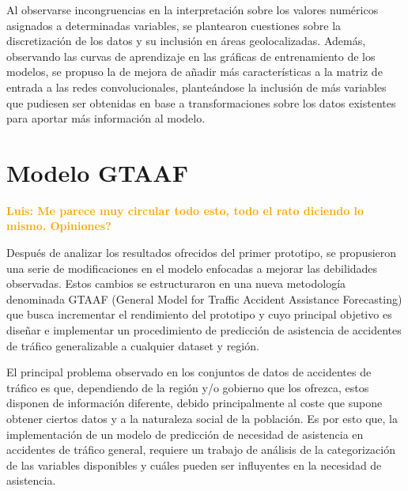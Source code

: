 
Al observarse incongruencias en la interpretación sobre los valores numéricos asignados a determinadas variables, se plantearon cuestiones sobre la discretización de los datos y su inclusión en áreas geolocalizadas. Además, observando las curvas de aprendizaje en las gráficas de entrenamiento de los modelos, se propuso la de mejora de añadir más características a la matriz de entrada a las redes convolucionales, planteándose la inclusión de más variables que pudiesen ser obtenidas en base a transformaciones sobre los datos existentes para aportar más información al modelo.

\section{Modelo GTAAF}
\label{METODOLOGIA_GTAAF}


\textcolor{orange}{\textbf{Luis: Me parece muy circular todo esto, todo el rato diciendo lo mismo. Opiniones?}}

Después de analizar los resultados ofrecidos del primer prototipo, se propusieron una serie de modificaciones en el modelo enfocadas a mejorar las debilidades observadas. Estos cambios se estructuraron en una nueva metodología denominada GTAAF (General Model for Traffic Accident Assistance Forecasting) que busca incrementar el rendimiento del prototipo y cuyo principal objetivo es diseñar e implementar un procedimiento de predicción de asistencia de accidentes de tráfico generalizable a cualquier dataset y región. 

El principal problema observado en los conjuntos de datos de accidentes de tráfico es que, dependiendo de la región y/o gobierno que los ofrezca, estos disponen de información diferente, debido principalmente al coste que supone obtener ciertos datos y a la naturaleza social de la población. Es por esto que, la implementación de un modelo de predicción de necesidad de asistencia en accidentes de tráfico general, requiere un trabajo de análisis de la categorización de las variables disponibles y cuáles pueden ser influyentes en la necesidad de asistencia.

